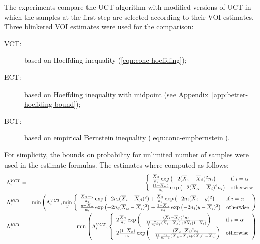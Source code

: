 \documentclass{article}
\begin{document}
The experiments compare the UCT algorithm \cite{Kocsis.uct} with modified
versions of UCT in which the samples at the first step are selected according
to their VOI estimates. Three blinkered VOI estimates were used for the comparison:
\begin{description}
\item[VCT:] based on Hoeffding inequality (\ref{eqn:conc-hoeffding});
\item[ECT:] based on Hoeffding inequality with midpoint (see Appendix~\ref{app:better-hoeffding-bound});
\item[BCT:] based on empirical Bernstein inequality (\ref{eqn:conc-empbernstein}).
\end{description}
For simplicity, the bounds on probability for unlimited number of samples were used in the estimate formulas. The estimates where computed as follows:
\begin{eqnarray}\
  \Lambda_i^{VCT}& =&\left\{
  \begin{array}{l l}
    \frac {\overline X_\beta} {n_i}\exp\left(- 2(\overline X_i - \overline X_\beta)^2 n_i\right)
      & \mbox{{\rm if} $i=\alpha$} \\
    \frac {(1-\overline  X_\alpha)} {n_i}\exp\left(- 2(\overline X_\alpha - \overline X_i)^2 n_i\right)
      &  \mbox{\rm otherwise}
  \end{array}  \right.\nonumber\\
  \Lambda_i^{ECT}& =&\min\left(\Lambda_i^{VCT}, \min_y\left\{
  \begin{array}{l l}
    \frac {\overline X_\beta-y} {n_i}\exp\left(-2 n_i(\overline X_i-\overline X_\beta)^2\right)
    +\frac {\overline X_\beta} {n_i}\exp\left(-2 n_i(\overline X_i-y)^2\right)
      & \mbox{{\rm if} $i=\alpha$} \\
\frac {y-\overline X_\alpha} {n_i}\exp\left(-2 n_i(\overline X_\alpha-\overline
  X_i)^2\right)+\frac {1-\overline X_\alpha} {n_i}\exp\left(-2 n_i(y-\overline X_i)^2\right)
      &  \mbox{\rm otherwise}
  \end{array} \right.\right) \nonumber\\
  \Lambda_i^{BCT}& =&\min\left(\Lambda_i^{VCT},\left\{
  \begin{array}{l l}
    2\frac {\overline X_\beta} {n_i}\exp\left(- \frac {(\overline X_i - \overline X_\beta)^2 n_i} {\frac {14} 3 \frac {n_i} {n_i-1}(\overline X_i - \overline X_\beta) + 2 \overline X_i(1-\overline X_i)} \right)
      & \mbox{{\rm if} $i=\alpha$} \\
    2\frac {(1-\overline  X_\alpha)} {n_i}\exp\left(- \frac {(\overline X_\alpha - \overline X_i)^2 n_i} {\frac {14} 3 \frac {n_i} {n_i-1}(\overline X_\alpha - \overline X_i) + 2 \overline X_i(1-\overline X_i)} \right)
      &  \mbox{\rm otherwise}
  \end{array} \right.\right)
\label{eqn:emp-estimates}
\end{eqnarray}
\end{document}
